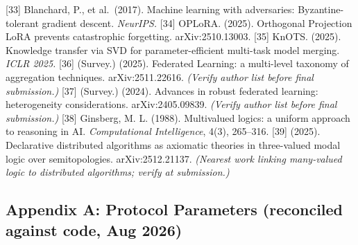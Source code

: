 {[}33{]} Blanchard, P., et al.~(2017). Machine learning with
adversaries: Byzantine-tolerant gradient descent. \emph{NeurIPS.}
{[}34{]} OPLoRA. (2025). Orthogonal Projection LoRA prevents
catastrophic forgetting. arXiv:2510.13003. {[}35{]} KnOTS. (2025).
Knowledge transfer via SVD for parameter-efficient multi-task model
merging. \emph{ICLR 2025.} {[}36{]} (Survey.) (2025). Federated
Learning: a multi-level taxonomy of aggregation techniques.
arXiv:2511.22616. \emph{(Verify author list before final submission.)}
{[}37{]} (Survey.) (2024). Advances in robust federated learning:
heterogeneity considerations. arXiv:2405.09839. \emph{(Verify author
list before final submission.)} {[}38{]} Ginsberg, M. L. (1988).
Multivalued logics: a uniform approach to reasoning in AI.
\emph{Computational Intelligence}, 4(3), 265--316. {[}39{]} (2025).
Declarative distributed algorithms as axiomatic theories in three-valued
modal logic over semitopologies. arXiv:2512.21137. \emph{(Nearest work
linking many-valued logic to distributed algorithms; verify at
submission.)}

\subsection{Appendix A: Protocol Parameters (reconciled against code,
Aug
2026)}\label{appendix-a-protocol-parameters-reconciled-against-code-aug-2026}

